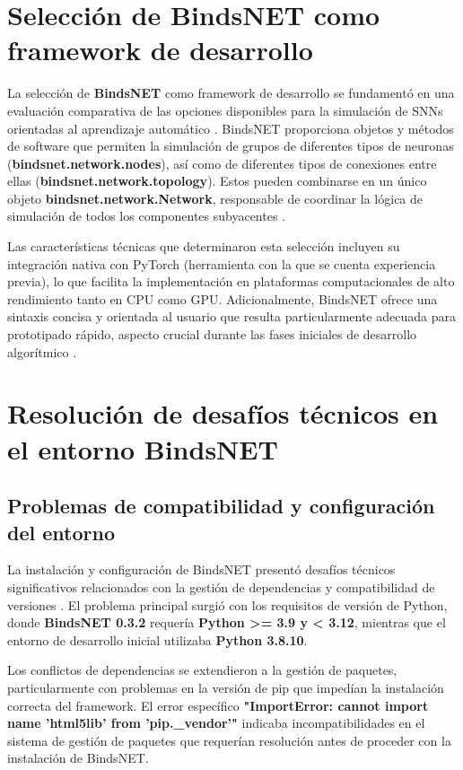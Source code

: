 \section{Selección de BindsNET como framework de desarrollo}

La selección de \textbf{BindsNET} como framework de desarrollo se fundamentó en una evaluación comparativa de las opciones disponibles para la simulación de SNNs orientadas al aprendizaje automático \cite{Hazan2018_BindsNET}. BindsNET proporciona objetos y métodos de software que permiten la simulación de grupos de diferentes tipos de neuronas (\textbf{bindsnet.network.nodes}), así como de diferentes tipos de conexiones entre ellas (\textbf{bindsnet.network.topology}). Estos pueden combinarse en un único objeto \textbf{bindsnet.network.Network}, responsable de coordinar la lógica de simulación de todos los componentes subyacentes \cite{bindsnet_docs}.

Las características técnicas que determinaron esta selección incluyen su integración nativa con PyTorch (herramienta con la que se cuenta experiencia previa), lo que facilita la implementación en plataformas computacionales de alto rendimiento tanto en CPU como GPU. Adicionalmente, BindsNET ofrece una sintaxis concisa y orientada al usuario que resulta particularmente adecuada para prototipado rápido, aspecto crucial durante las fases iniciales de desarrollo algorítmico \cite{bindsnet_docs}.

\section{Resolución de desafíos técnicos en el entorno BindsNET}
\subsection{Problemas de compatibilidad y configuración del entorno}

La instalación y configuración de BindsNET presentó desafíos técnicos significativos relacionados con la gestión de dependencias y compatibilidad de versiones . El problema principal surgió con los requisitos de versión de Python, donde \textbf{BindsNET 0.3.2} requería \textbf{Python >= 3.9 y < 3.12}, mientras que el entorno de desarrollo inicial utilizaba \textbf{Python 3.8.10}.

Los conflictos de dependencias se extendieron a la gestión de paquetes, particularmente con problemas en la versión de pip que impedían la instalación correcta del framework. El error específico \textbf{"ImportError: cannot import name 'html5lib' from 'pip.\_vendor'"} indicaba incompatibilidades en el sistema de gestión de paquetes que requerían resolución antes de proceder con la instalación de BindsNET.

